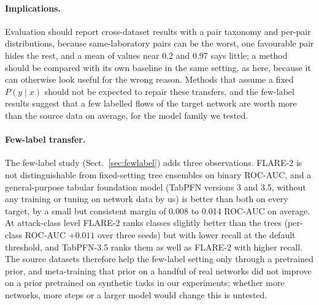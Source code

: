 \documentclass[pdflatex,sn-mathphys-num]{sn-jnl}%
\begin{document}
\paragraph{Implications.}
Evaluation should report cross-dataset results with a pair taxonomy and per-pair distributions, because same-laboratory pairs can be the worst, one favourable pair hides the rest, and a mean of values near 0.2 and 0.97 says little; a method should be compared with its own baseline in the same setting, as here, because it can otherwise look useful for the wrong reason.
Methods that assume a fixed $P(y\mid x)$ should not be expected to repair these transfers, and the few-label results suggest that a few labelled flows of the target network are worth more than the source data on average, for the model family we tested.

\paragraph{Few-label transfer.}
The few-label study (Sect.~\ref{sec:fewlabel}) adds three observations.
FLARE-2 is not distinguishable from fixed-setting tree ensembles on binary ROC-AUC, and a general-purpose tabular foundation model (TabPFN versions 3 and 3.5, without any training or tuning on network data by us) is better than both on every target, by a small but consistent margin of 0.008 to 0.014 ROC-AUC on average.
At attack-class level FLARE-2 ranks classes slightly better than the trees (per-class ROC-AUC $+0.011$ over three seeds) but with lower recall at the default threshold, and TabPFN-3.5 ranks them as well as FLARE-2 with higher recall.
The source datasets therefore help the few-label setting only through a pretrained prior, and meta-training that prior on a handful of real networks did not improve on a prior pretrained on synthetic tasks in our experiments; whether more networks, more steps or a larger model would change this is untested.
\end{document}
